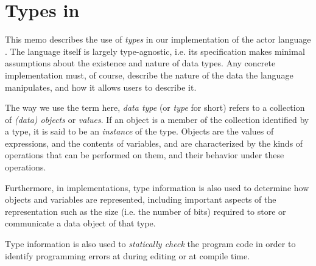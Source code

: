 \chapter{Types in \Cal}\label{chap:TypesIntroduction}

This memo describes the use of {\em types} in our implementation of
the \Cal actor language \cite{CLR1}. The \Cal language itself is
largely type-agnostic, i.e. its specification makes minimal
assumptions about the existence and nature of data types. Any concrete
implementation must, of course, describe the nature of the data the
language manipulates, and how it allows users to describe it.

The way we use the term here, {\em data type} (or {\em type} for short) refers to a
collection of {\em (data) objects} or {\em values}.  If an object is a
member of the collection identified by a type, it is said to be an
{\em instance} of the type. Objects are the values of expressions, and
the contents of variables, and are characterized by the kinds of
operations that can be performed on them, and their behavior under
these operations.

Furthermore, in implementations, type information is also used to
determine how objects and variables are represented, including
important aspects of the representation such as the size (i.e. the
number of bits) required to store or communicate a data object of that
type.

Type information is also used to {\em statically check} the program
code in order to identify programming errors at during editing or at
compile time.





